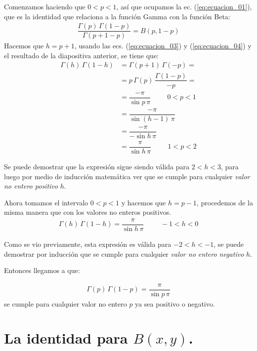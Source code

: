 Comenzamos haciendo que $0 < p < 1$, así que ocupamos la ec. (\ref{eq:ecuacion_01}), que es la identidad que relaciona a la función Gamma con la función Beta:
\begin{align*}
\dfrac{\Gamma(p) \, \Gamma(1 - p)}{\Gamma(p + 1 - p)} = B(p, 1 - p) 
\end{align*}
Hacemos que $h = p + 1$, usando las ecs. (\ref{eq:ecuacion_03}) y (\ref{eq:ecuacion_04}) y el resultado de la diapositiva anterior, se tiene que:
\begin{align*}
\Gamma(h) \, \Gamma(1 - h) &=  \Gamma(p + 1) \, \Gamma(-p) = \\[0.5em] 
&= p \, \Gamma(p)  \, \dfrac{\Gamma(1 - p)}{- p} = \\[0.5em] 
&= \dfrac{-\pi}{\sin p \, \pi} \hspace{1cm} 0 < p < 1 \\[0.5em]
&= \dfrac{-\pi}{\sin (h - 1) \, \pi} \\[0.5em] 
&= \dfrac{-\pi}{- \sin h \, \pi} \\[0.5em] 
&= \dfrac{\pi}{\sin h \, \pi} \hspace{1cm} 1 < p < 2
\end{align*}

Se puede demostrar que la expresión sigue siendo válida para \hfill \break $2 < h < 3$, para luego por medio de inducción matemática ver que se cumple para cualquier \emph{valor no entero positivo} $h$.
\par
Ahora tomamos el intervalo $0 < p < 1$ y hacemos que $h = p - 1$,  procedemos de la misma manera que con los valores no enteros positivos.
\begin{align*}
\Gamma(h) \, \Gamma(1 - h) = \dfrac{\pi}{\sin h \, \pi} \hspace{1cm} -1 < h < 0
\end{align*}

Como se vio previamente, esta expresión es válida para $-2 < h < -1$,  se puede demostrar por inducción que se cumple para cualquier \emph{valor no entero negativo} $h$.
\par
Entonces llegamos a que:

\begin{align*}
\Gamma(p) \, \Gamma(1 - p) = \dfrac{\pi}{\sin p \, \pi}
\end{align*}
se cumple para cualquier valor no entero $p$ ya sea positivo o negativo.

\section{La identidad para \texorpdfstring{$B(x, y)$}{B(x, y)}.}
